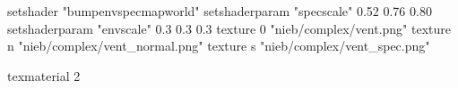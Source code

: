setshader "bumpenvspecmapworld"
setshaderparam "specscale" 0.52 0.76 0.80
setshaderparam "envscale"  0.3 0.3 0.3
   texture 0 "nieb/complex/vent.png"
   texture n "nieb/complex/vent_normal.png"
   texture s "nieb/complex/vent_spec.png"

texmaterial 2

